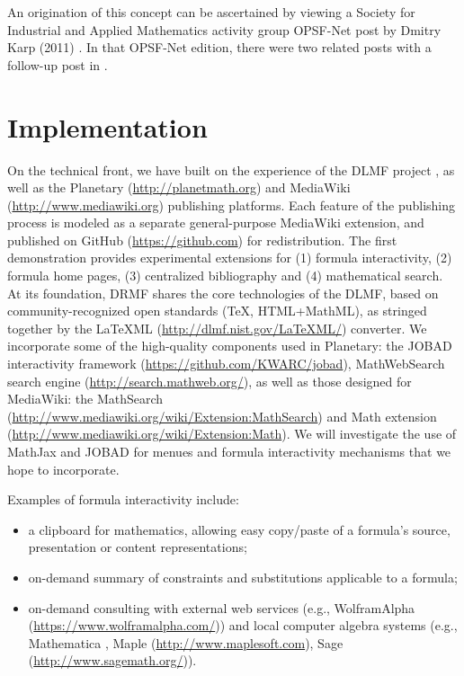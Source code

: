 \documentclass{easychair}
\begin{document}
An origination of this concept can be ascertained by viewing a Society for
Industrial and Applied Mathematics activity group OPSF-Net post by Dmitry Karp 
(2011) \cite[Topic \#5]{OPSFNET18_4}.  
In that OPSF-Net edition, there were two related 
posts \cite[Topic \#6, Topic\#7]{OPSFNET18_4} with a follow-up post in
\cite[Topic \#3]{OPSFNET18_6}.

\section{Implementation}

On the technical front, we have built on the experience of the 
DLMF project \cite[see also \url{http://dlmf.nist.gov}]{NIST}, as well as the 
Planetary (\url{http://planetmath.org}) and 
MediaWiki (\url{http://www.mediawiki.org}) publishing platforms. 
Each feature of the publishing process is modeled 
as a separate general-purpose MediaWiki extension, and published on GitHub 
(\url{https://github.com}) for 
redistribution.  The first demonstration provides experimental extensions 
for (1) formula interactivity, (2) formula home pages, (3) centralized bibliography 
and (4) mathematical search. At its foundation, DRMF shares the core technologies 
of the DLMF, based on community-recognized open standards (\TeX, 
HTML+MathML), as 
stringed together by the \LaTeX ML (\url{http://dlmf.nist.gov/LaTeXML/}) converter. We incorporate some of the high-quality 
components used in Planetary: the JOBAD interactivity framework
(\url{https://github.com/KWARC/jobad}), MathWebSearch search engine
(\url{http://search.mathweb.org/}), as well as those designed for 
MediaWiki: the MathSearch 
(\url{http://www.mediawiki.org/wiki/Extension:MathSearch})
and Math extension
(\url{http://www.mediawiki.org/wiki/Extension:Math}).  
We will investigate the use of MathJax and JOBAD for menues and formula interactivity 
mechanisms that we hope to incorporate. 

Examples of formula 
interactivity include:
\begin{itemize}
\item a clipboard for mathematics, allowing easy copy/paste of a formula's source, presentation or content representations;
\item on-demand summary of constraints and substitutions applicable to a formula;
\item on-demand consulting with external web services 
(e.g., WolframAlpha (\url{https://www.wolframalpha.com/})) 
and local computer algebra systems (e.g., Mathematica \cite{Mathematica}, 
Maple (\url{http://www.maplesoft.com}), Sage
(\url{http://www.sagemath.org/})).
\end{itemize}
\end{document}
